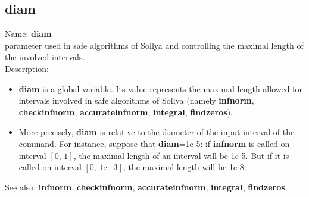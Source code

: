 \subsection{ diam }
\noindent Name: \textbf{diam}\\
parameter used in safe algorithms of Sollya and controlling the maximal length of the involved intervals.\\

\noindent Description: \begin{itemize}

\item \textbf{diam} is a global variable. Its value represents the maximal length allowed
   for intervals involved in safe algorithms of Sollya (namely \textbf{infnorm},
   \textbf{checkinfnorm}, \textbf{accurateinfnorm}, \textbf{integral}, \textbf{findzeros}).

\item More precisely, \textbf{diam} is relative to the diameter of the input interval of
   the command. For instance, suppose that \textbf{diam}=1e-5: if \textbf{infnorm} is called
   on interval $[0,\,1]$, the maximal length of an interval will be 1e-5. But if it
   is called on interval $[0,\,1\mathrm{e}{-3}]$, the maximal length will be 1e-8.
\end{itemize}
See also: \textbf{infnorm}, \textbf{checkinfnorm}, \textbf{accurateinfnorm}, \textbf{integral}, \textbf{findzeros}
